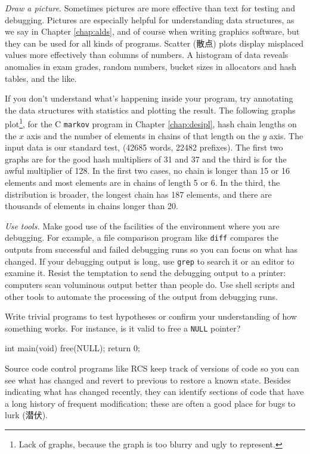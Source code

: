 \emph{Draw a picture}. Sometimes pictures are more effective than text for
testing and debugging. Pictures are especially helpful for understanding
data structures, as we say in Chapter \ref{chap:alds}, and of course when
writing graphics software, but they can be used for all kinds of programs.
Scatter (散点) plots display misplaced values more effectively than columns
of numbers. A histogram of data reveals anomalies in exam grades, random
numbers, bucket sizes in allocators and hash tables, and the like.

If you don't understand what's happening inside your program, try
annotating the data structures with statistics and plotting the result. The
following graphs plot\footnote{Lack of graphs, because the graph is too
blurry and ugly to represent.}, for the C \verb'markov' program in Chapter
\ref{chap:desipl}, hash chain lengths on the $x$ axis and the number of
elements in chains of that length on the $y$ axis. The input data is our
standard test,  (42685 words, 22482
prefixes). The first two graphs are for the good hash multipliers of 31 and
37 and the third is for the awful multiplier of 128. In the first two
cases, no chain is longer than 15 or 16 elements and most elements are in
chains of length 5 or 6. In the third, the distribution is broader, the
longest chain has 187 elements, and there are thousands of elements in
chains longer than 20.

\emph{Use tools.} Make good use of the facilities of the environment where
you are debugging. For example, a file comparison program like \verb'diff'
compares the outputs from successful and failed debugging runs so you can
focus on what has changed. If your debugging output is long, use
\verb'grep' to search it or an editor to examine it. Resist the temptation
to send the debugging output to a printer: computers scan voluminous output
better than people do. Use shell scripts and other tools to automate the
processing of the output from debugging runs.

Write trivial programs to test hypotheses or confirm your understanding of
how something works. For instance, is it valid to free a \verb'NULL' pointer?
\begin{wellcode}
    int main(void)
    {
        free(NULL);
        return 0;
    }
\end{wellcode}

Source code control programs like RCS keep track of versions of code so you
can see what has changed and revert to previous to restore a known state.
Besides indicating what has changed recently, they can identify sections of
code that have a long history of frequent modification; these are often a
good place for bugs to lurk (潜伏).

